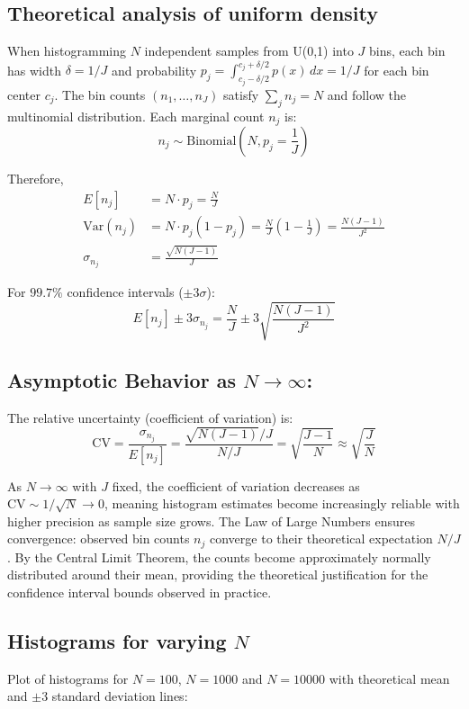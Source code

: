 \documentclass[12pt]{article}
\begin{document}
\subsection{Theoretical analysis of uniform density}

When histogramming $N$ independent samples from U(0,1) into $J$ bins, each bin has width $\delta = 1/J$ and probability $p_j = \int_{c_j - \delta/2}^{c_j + \delta/2} p(x)\,dx = 1/J$ for each bin center $c_j$. The bin counts $(n_1, \ldots, n_J)$ satisfy $\sum_j n_j = N$ and follow the multinomial distribution. Each marginal count $n_j$ is:
$$n_j \sim \text{Binomial}\left(N, p_j = \frac{1}{J}\right)$$

Therefore,
\begin{align*}
    E[n_j]          & = N \cdot p_j = \frac{N}{J}                                                         \\
    \text{Var}(n_j) & = N \cdot p_j(1-p_j) = \frac{N}{J}\left(1 - \frac{1}{J}\right) = \frac{N(J-1)}{J^2} \\
    \sigma_{n_j}    & = \frac{\sqrt{N(J-1)}}{J}
\end{align*}

For $99.7\%$ confidence intervals ($\pm 3\sigma$):
$$E[n_j] \pm 3\sigma_{n_j} = \frac{N}{J} \pm 3\sqrt{\frac{N(J-1)}{J^2}}$$

\subsection{Asymptotic Behavior as $N \to \infty$:}

The relative uncertainty (coefficient of variation) is:
$$\text{CV} = \frac{\sigma_{n_j}}{E[n_j]} = \frac{\sqrt{N(J-1)}/J}{N/J} = \sqrt{\frac{J-1}{N}} \approx \sqrt{\frac{J}{N}}$$

As $N \to \infty$ with $J$ fixed, the coefficient of variation decreases as $\text{CV} \sim 1/\sqrt{N} \to 0$, meaning histogram estimates become increasingly reliable with higher precision as sample size grows. The Law of Large Numbers ensures convergence: observed bin counts $n_j$ converge to their theoretical expectation $N/J$. By the Central Limit Theorem, the counts become approximately normally distributed around their mean, providing the theoretical justification for the confidence interval bounds observed in practice.

\subsection{Histograms for varying $N$}
Plot of histograms for $N=100$, $N=1000$ and $N=10000$ with theoretical mean and $\pm 3$ standard deviation lines:
\end{document}
